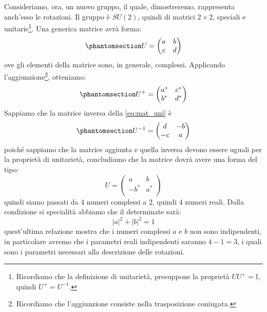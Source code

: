 Consideriamo, ora, un nuovo gruppo, il quale, dimostreremo, rappresenta anch'esso le rotazioni.
Il gruppo è $SU(2)$, quindi di matrici $2\times2$, speciali e unitarie\footnote{Ricordiamo che la definizione di unitarietà, presuppone la proprietà $UU^+=\mathds{I}$, quindi $U^+=U^{-1}$.}. Una generica matrice avrà forma:
\begin{equation}\phantomsection\label{eq:mat_uni}
  U=\begin{pmatrix}
 a&b \\
c &d\\
\end{pmatrix}
\end{equation}
ove gli elementi della matrice sono, in generale, complessi. Applicando l'aggiunzione\footnote{Ricordiamo che l'aggiunzione consiste nella trasposizione coniugata.}, otteniamo:
\begin{equation}\phantomsection\label{eq:mat_uni_agg}
  U^+=\begin{pmatrix}
 a^*&c^* \\
b^* &d^*\\
\end{pmatrix}
\end{equation}
Sappiamo che la matrice inversa della \eqref{eq:mat_uni} è
\begin{equation}\phantomsection\label{eq:mat_uni_inv}
  U^{-1}=\begin{pmatrix}
 d&-b \\
-c &a\\
\end{pmatrix}
\end{equation}
poiché sappiamo che la matrice aggiunta e quella inversa devono essere uguali per la proprietà di unitarietà, concludiamo che la matrice dovrà avere una forma del tipo:
\begin{equation}
  U=\begin{pmatrix}
 a&b \\
-b^* &a^*\\
\end{pmatrix}
\end{equation}
quindi siamo passati da 4 numeri complessi a 2, quindi 4 numeri reali. Dalla condizione si specialità abbiamo che il determinate sarà:
\begin{equation}
    |a|^2+|b|^2=1
\end{equation}
quest'ultima relazione mostra che i numeri complessi $a$ e $b$ non sono indipendenti, in particolare avremo che i parametri reali indipendenti saranno $4-1=3$, i quali sono i parametri necessari alla descrizione delle rotazioni.

